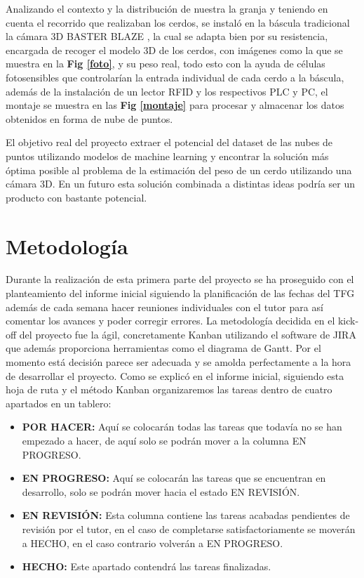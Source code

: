 \documentclass[12pt,a4paper]{article}
\begin{document}
Analizando el contexto y la distribución de nuestra la granja y teniendo en cuenta el recorrido que realizaban los cerdos, se instaló en la báscula tradicional la cámara 3D BASTER BLAZE \cite{camara}, la cual se adapta bien por su resistencia, encargada de recoger el modelo 3D de los cerdos, con imágenes como la que se muestra en la \textbf{Fig \ref{foto}}, y su peso real, todo esto con la ayuda de células fotosensibles que controlarían la entrada individual de cada cerdo a la báscula, además de la instalación de un lector RFID y los respectivos PLC y PC, el montaje se muestra en las \textbf{Fig \ref{montaje}} para procesar y almacenar los datos obtenidos en forma de nube de puntos.


El objetivo real del proyecto extraer el potencial del dataset de las nubes de puntos utilizando modelos de machine learning y encontrar la solución más óptima posible al problema de la estimación del peso de un cerdo utilizando una cámara 3D. En un futuro esta solución combinada a distintas ideas podría ser un producto con bastante potencial.







\section{Metodología}

Durante la realización de esta primera parte del proyecto se ha proseguido con el planteamiento del informe inicial siguiendo la planificación de las fechas del TFG además de cada semana hacer reuniones individuales con el tutor para así comentar los avances y poder corregir errores. La metodología decidida en el kick-off del proyecto fue la ágil, concretamente Kanban utilizando el software de JIRA \cite{JIRA} que además proporciona herramientas como el diagrama de Gantt. Por el momento está decisión parece ser adecuada y se amolda perfectamente a la hora de desarrollar el proyecto. Como se explicó en el informe inicial, siguiendo esta hoja de ruta y el método Kanban organizaremos las tareas dentro de cuatro apartados en un tablero:



\begin{itemize}
  \item \textbf{POR HACER: }Aquí se colocarán todas las tareas que todavía no se han empezado a hacer, de aquí solo se podrán mover a la columna EN PROGRESO.
  \item \textbf{EN PROGRESO: }Aquí se colocarán las tareas que se encuentran en desarrollo, solo se podrán mover hacia el estado EN REVISIÓN.
  \item \textbf{EN REVISIÓN: }Esta columna contiene las tareas acabadas pendientes de revisión por el tutor, en el caso de completarse satisfactoriamente se moverán a HECHO, en el caso contrario volverán a EN PROGRESO.
  \item \textbf{HECHO: }Este apartado contendrá las tareas finalizadas.
\end{itemize}
\end{document}
